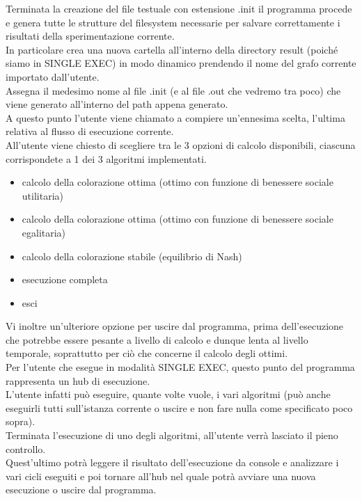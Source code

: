Terminata la creazione del file testuale con estensione .init il programma procede e genera tutte le strutture del filesystem necessarie per salvare correttamente i risultati della sperimentazione corrente.\\
In particolare crea una nuova cartella all'interno della directory result (poiché siamo in SINGLE EXEC) in modo dinamico prendendo il nome del grafo corrente importato dall'utente.\\
Assegna il medesimo nome al file .init (e al file .out che vedremo tra poco) che viene generato all'interno del path appena generato.\\

A questo punto l'utente viene chiamato a compiere un'ennesima scelta, l'ultima relativa al flusso di esecuzione corrente.\\
All'utente viene chiesto di scegliere tra le 3 opzioni di calcolo disponibili, ciascuna corrispondete a 1 dei 3 algoritmi implementati.

\begin{itemize}
	\item calcolo della colorazione ottima (ottimo con funzione di benessere sociale utilitaria)
	\item calcolo della colorazione ottima (ottimo con funzione di benessere sociale egalitaria)
	\item calcolo della colorazione stabile (equilibrio di Nash)
	\item esecuzione completa
	\item esci
\end{itemize}

Vi inoltre un'ulteriore opzione per uscire dal programma, prima dell'esecuzione che potrebbe essere pesante a livello di calcolo e dunque lenta al livello temporale, soprattutto per ciò che concerne il calcolo degli ottimi.\\

Per l'utente che esegue in modalità SINGLE EXEC, questo punto del programma rappresenta un hub di esecuzione.\\
L'utente infatti può eseguire, quante volte vuole, i vari algoritmi (può anche eseguirli tutti sull'istanza corrente o uscire e non fare nulla come specificato poco sopra).\\
Terminata l'esecuzione di uno degli algoritmi, all'utente verrà lasciato il pieno controllo.\\
Quest'ultimo potrà leggere il risultato dell'esecuzione da console e analizzare i vari cicli eseguiti e poi tornare all'hub nel quale potrà avviare una nuova esecuzione o uscire dal programma.\\

